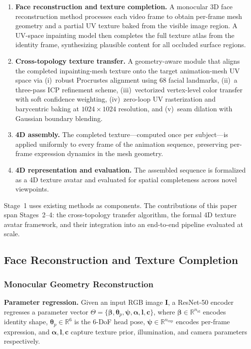 \documentclass[conference]{IEEEtran}
\newcommand{\R}{\mathbb{R}}
\begin{document}
\begin{enumerate}[leftmargin=*,nosep]
  \item \textbf{Face reconstruction and texture completion.} A monocular 3D
    face reconstruction method processes each video frame to obtain per-frame
    mesh geometry and a partial UV texture baked from the visible image region.
    A UV-space inpainting model then completes the full texture atlas from the
    identity frame, synthesizing plausible content for all occluded surface
    regions.
  \item \textbf{Cross-topology texture transfer.} A geometry-aware module that
    aligns the completed inpainting-mesh texture onto the target animation-mesh
    UV space via (i)~robust Procrustes alignment using 68 facial landmarks,
    (ii)~a three-pass ICP refinement scheme, (iii)~vectorized vertex-level color
    transfer with soft confidence weighting, (iv)~zero-loop UV rasterization and
    barycentric baking at $1024\!\times\!1024$ resolution, and (v)~seam dilation
    with Gaussian boundary blending.
  \item \textbf{4D assembly.} The completed texture---computed once per
    subject---is applied uniformly to every frame of the animation sequence,
    preserving per-frame expression dynamics in the mesh geometry.
  \item \textbf{4D representation and evaluation.} The assembled sequence is
    formalized as a 4D texture avatar and evaluated for spatial completeness
    across novel viewpoints.
\end{enumerate}

Stage~1 uses existing methods as components. The contributions of this paper
span Stages~2--4: the cross-topology transfer algorithm, the formal 4D texture
avatar framework, and their integration into an end-to-end pipeline evaluated
at scale.

\subsection{Face Reconstruction and Texture Completion}
\label{sec:recon}

\subsubsection{Monocular Geometry Reconstruction}

\medskip\noindent\textbf{Parameter regression.}
Given an input RGB image $\mathbf{I}$, a ResNet-50 encoder regresses a
parameter vector $\Theta = \{\bm{\beta}, \bm{\theta}_p, \bm{\psi}, \bm{\alpha},
\mathbf{l}, \mathbf{c}\}$, where $\bm{\beta} \in \R^{n_{\text{id}}}$ encodes
identity shape, $\bm{\theta}_p \in \R^{6}$ is the 6-DoF head pose,
$\bm{\psi} \in \R^{n_{\text{exp}}}$ encodes per-frame expression, and
$\bm{\alpha}, \mathbf{l}, \mathbf{c}$ capture texture prior, illumination, and
camera parameters respectively.
\end{document}
